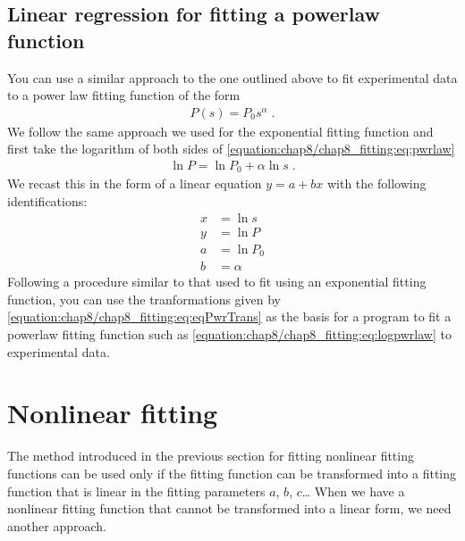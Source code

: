 \documentclass[letterpaper,10pt,english]{sphinxmanual}
\begin{document}
\subsection{Linear regression for fitting a power\sphinxhyphen{}law function}
\label{\detokenize{chap8/chap8_fitting:linear-regression-for-fitting-a-power-law-function}}\label{\detokenize{chap8/chap8_fitting:index-3}}
\sphinxAtStartPar
You can use a similar approach to the one outlined above to fit experimental data to a power law fitting function of the form
\begin{equation}\label{equation:chap8/chap8_fitting:eq:pwrlaw}
\begin{split}P(s) = P_0 s^\alpha \;.\end{split}
\end{equation}
\sphinxAtStartPar
We follow the same approach we used for the exponential fitting function and first take the logarithm of both sides of \eqref{equation:chap8/chap8_fitting:eq:pwrlaw}
\begin{equation}\label{equation:chap8/chap8_fitting:eq:logpwrlaw}
\begin{split}\ln P = \ln P_0 + \alpha \ln s \;.\end{split}
\end{equation}
\sphinxAtStartPar
We recast this in the form of a linear equation \(y = a + bx\) with the following identifications:
\begin{equation}\label{equation:chap8/chap8_fitting:eq:eqPwrTrans}
\begin{split}x &= \ln s\\
y &= \ln P\\
a &= \ln P_{0}\\
b &= \alpha\end{split}
\end{equation}
\sphinxAtStartPar
Following a procedure similar to that used to fit using an exponential fitting function, you can use the tranformations given by \eqref{equation:chap8/chap8_fitting:eq:eqPwrTrans} as the basis for a program to fit a power\sphinxhyphen{}law fitting function such as \eqref{equation:chap8/chap8_fitting:eq:logpwrlaw} to experimental data.

\ignorespaces 

\section{Nonlinear fitting}
\label{\detokenize{chap8/chap8_fitting:nonlinear-fitting}}\label{\detokenize{chap8/chap8_fitting:sec-nonlinfit}}\label{\detokenize{chap8/chap8_fitting:index-4}}
\sphinxAtStartPar
The method introduced in the previous section for fitting nonlinear fitting functions can be used only if the fitting function can be transformed into a fitting function that is linear in the fitting parameters  \(a\), \(b\), \(c\)…  When we have a nonlinear fitting function that cannot be transformed into a linear form, we need another approach.
\end{document}

